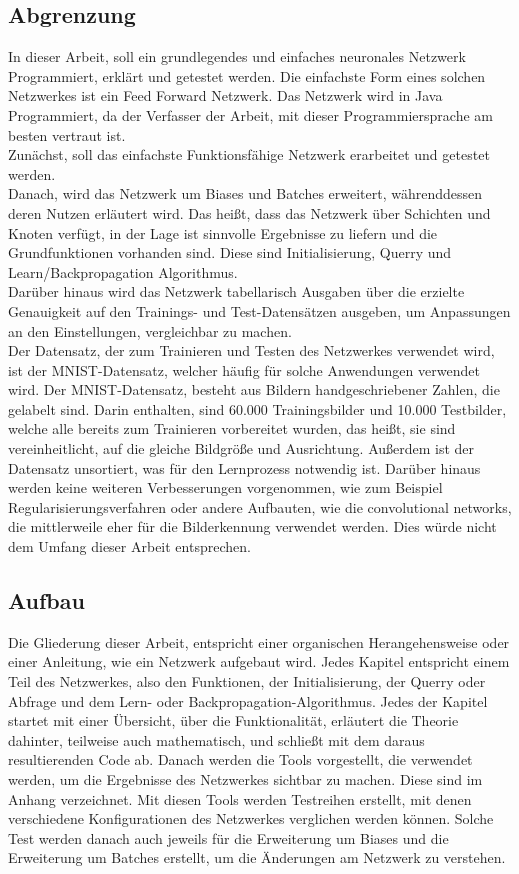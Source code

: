 \documentclass[12pt]{article}
\begin{document}
\subsection{Abgrenzung}
In dieser Arbeit, soll ein grundlegendes und einfaches neuronales Netzwerk Programmiert, erklärt und getestet werden. Die einfachste Form eines solchen Netzwerkes ist ein Feed Forward Netzwerk.  
Das Netzwerk wird in Java Programmiert, da der Verfasser der Arbeit, mit dieser Programmiersprache am besten vertraut ist.\\
Zunächst, soll das einfachste Funktionsfähige Netzwerk erarbeitet und getestet werden.\\
Danach, wird das Netzwerk um Biases und Batches erweitert, währenddessen deren Nutzen erläutert wird. Das heißt, dass das Netzwerk über Schichten und Knoten verfügt, in der Lage ist sinnvolle Ergebnisse zu liefern und die Grundfunktionen vorhanden sind. Diese sind Initialisierung, Querry und Learn/Backpropagation Algorithmus. \\
Darüber hinaus wird das Netzwerk tabellarisch Ausgaben über die erzielte Genauigkeit auf den Trainings- und Test-Datensätzen ausgeben, um Anpassungen an den Einstellungen, vergleichbar zu machen.  \\
Der Datensatz, der zum Trainieren und Testen des Netzwerkes verwendet wird, ist der MNIST-Datensatz, welcher häufig für solche Anwendungen verwendet wird. Der MNIST-Datensatz, besteht aus Bildern handgeschriebener Zahlen, die gelabelt sind. Darin enthalten, sind 60.000 Trainingsbilder und 10.000 Testbilder, welche alle bereits zum Trainieren vorbereitet wurden, das heißt, sie sind vereinheitlicht, auf die gleiche Bildgröße und Ausrichtung. Außerdem ist der Datensatz unsortiert, was für den Lernprozess notwendig ist.
Darüber hinaus werden keine weiteren Verbesserungen vorgenommen, wie zum Beispiel Regularisierungsverfahren oder andere Aufbauten, wie die convolutional networks, die mittlerweile eher für die Bilderkennung verwendet werden. Dies würde nicht dem Umfang dieser Arbeit entsprechen.
\subsection{Aufbau}
Die Gliederung dieser Arbeit, entspricht einer organischen Herangehensweise oder einer Anleitung, wie ein Netzwerk aufgebaut wird. Jedes Kapitel entspricht einem Teil des Netzwerkes, also den Funktionen, der Initialisierung, der Querry oder Abfrage und dem Lern- oder Backpropagation-Algorithmus. Jedes der Kapitel startet mit einer Übersicht, über die Funktionalität, erläutert die Theorie dahinter, teilweise auch mathematisch, und schließt mit dem daraus resultierenden Code ab. 
Danach werden die Tools vorgestellt, die verwendet werden, um die Ergebnisse des Netzwerkes sichtbar zu machen. Diese sind im Anhang verzeichnet. 
Mit diesen Tools werden Testreihen erstellt, mit denen verschiedene Konfigurationen des Netzwerkes verglichen werden können. Solche Test werden danach auch jeweils für die Erweiterung um Biases und die Erweiterung um Batches erstellt, um die Änderungen am Netzwerk zu verstehen.
\end{document}

